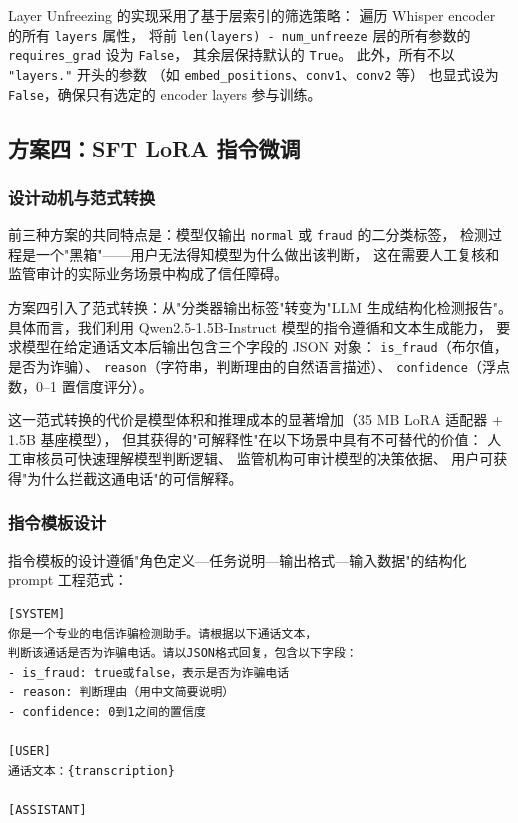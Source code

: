 \documentclass[11pt,a4paper]{ctexart}
\begin{document}
Layer Unfreezing 的实现采用了基于层索引的筛选策略：
遍历 Whisper encoder 的所有 \texttt{layers} 属性，
将前 \texttt{len(layers) - num\_unfreeze} 层的所有参数的
\texttt{requires\_grad} 设为 \texttt{False}，
其余层保持默认的 \texttt{True}。
此外，所有不以 \texttt{"layers."} 开头的参数
（如 \texttt{embed\_positions}、\texttt{conv1}、\texttt{conv2} 等）
也显式设为 \texttt{False}，确保只有选定的 encoder layers 参与训练。

\subsection{方案四：SFT LoRA 指令微调}

\subsubsection{设计动机与范式转换}

前三种方案的共同特点是：模型仅输出 \texttt{normal} 或 \texttt{fraud} 的二分类标签，
检测过程是一个"黑箱"——用户无法得知模型为什么做出该判断，
这在需要人工复核和监管审计的实际业务场景中构成了信任障碍。

方案四引入了范式转换：从"分类器输出标签"转变为"LLM 生成结构化检测报告"。
具体而言，我们利用 Qwen2.5-1.5B-Instruct 模型的指令遵循和文本生成能力，
要求模型在给定通话文本后输出包含三个字段的 JSON 对象：
\texttt{is\_fraud}（布尔值，是否为诈骗）、
\texttt{reason}（字符串，判断理由的自然语言描述）、
\texttt{confidence}（浮点数，0--1 置信度评分）。

这一范式转换的代价是模型体积和推理成本的显著增加（35 MB LoRA 适配器 + 1.5B 基座模型），
但其获得的"可解释性"在以下场景中具有不可替代的价值：
人工审核员可快速理解模型判断逻辑、
监管机构可审计模型的决策依据、
用户可获得"为什么拦截这通电话"的可信解释。

\subsubsection{指令模板设计}

指令模板的设计遵循"角色定义—任务说明—输出格式—输入数据"的结构化 prompt 工程范式：

\begin{verbatim}
[SYSTEM]
你是一个专业的电信诈骗检测助手。请根据以下通话文本，
判断该通话是否为诈骗电话。请以JSON格式回复，包含以下字段：
- is_fraud: true或false，表示是否为诈骗电话
- reason: 判断理由（用中文简要说明）
- confidence: 0到1之间的置信度

[USER]
通话文本：{transcription}

[ASSISTANT]
\end{verbatim}
\end{document}
